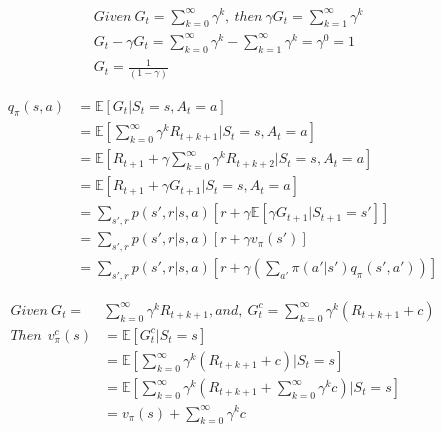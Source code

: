 \documentclass{article}
\begin{document}
\[
  \begin{aligned}
  &Given \ G_t = \sum_{k=0}^{\infty} \gamma^k, \ then \ \gamma G_t = \sum_{k=1}^{\infty} \gamma^k\\
  &G_t - \gamma G_t = \sum_{k=0}^{\infty} \gamma^k - \sum_{k=1}^{\infty} \gamma^k = \gamma^0 = 1\\
  &G_t = \frac {1} {(1 - \gamma)}
  \end{aligned}
\]

\[
  \begin{aligned}
    q_{\pi}(s,a) &= \mathbb{E}[G_t| S_{t}=s, A_{t}=a]\\
    &= \mathbb{E}[\sum_{k=0}^{\infty}\gamma^kR_{t+k+1} | S_{t}=s, A_{t}=a]\\
    &= \mathbb{E}[R_{t+1} + \gamma \sum_{k=0}^{\infty}\gamma^kR_{t+k+2} | S_{t}=s, A_{t}=a]\\
    &= \mathbb{E}[R_{t+1} + \gamma G_{t+1} | S_{t}=s, A_{t}=a]\\
    &= \sum_{s',r}p(s',r|s,a)[r + \gamma \mathbb{E}[\gamma G_{t+1} | S_{t+1}=s']]\\
    &= \sum_{s',r}p(s',r|s,a)[r + \gamma v_\pi(s')]\\
    &= \sum_{s',r}p(s',r|s,a)[r + \gamma (\sum_{a'}\pi(a'|s') q_{\pi}(s',a'))]
  \end{aligned}
\]

\[
  \begin{aligned}
    Given \ G_t = &\sum_{k=0}^{\infty}\gamma^kR_{t+k+1}, and, \ G_t^c = \sum_{k=0}^{\infty}\gamma^k(R_{t+k+1} + c)\\
    Then \ \ v_{\pi}^c(s) &= \mathbb{E}[G_t^c | S_{t}=s]\\
    &= \mathbb{E}[\sum_{k=0}^{\infty}\gamma^k(R_{t+k+1} + c) | S_{t}=s]\\
    &= \mathbb{E}[\sum_{k=0}^{\infty}\gamma^k(R_{t+k+1} + \sum_{k=0}^{\infty}\gamma^kc) | S_{t}=s]\\
    &= v_{\pi}(s) + \sum_{k=0}^{\infty}\gamma^kc
  \end{aligned}
\]
\end{document}
